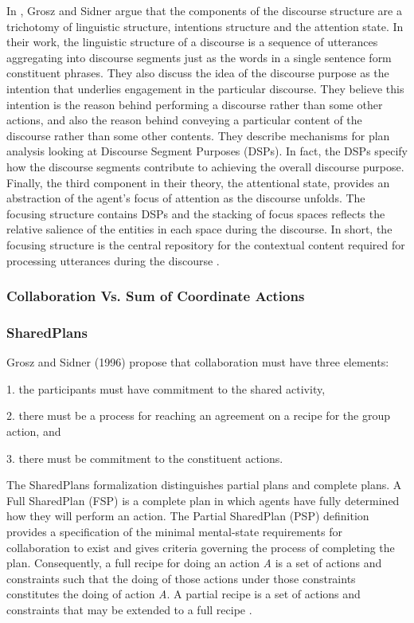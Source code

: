 \documentclass[11pt]{article}
\begin{document}
In \cite{grosz:plans-discourse}, Grosz and Sidner argue that the components of
the discourse structure are a trichotomy of linguistic structure, intentions
structure and the attention state. In their work, the linguistic structure of a
discourse is a sequence of utterances aggregating into discourse segments just
as the words in a single sentence form constituent phrases. They also discuss
the idea of the discourse purpose as the intention that underlies engagement in
the particular discourse. They believe this intention is the reason behind
performing a discourse rather than some other actions, and also the reason
behind conveying a particular content of the discourse rather than some other
contents. They describe mechanisms for plan analysis looking at Discourse
Segment Purposes (DSPs). In fact, the DSPs specify how the discourse segments
contribute to achieving the overall discourse purpose. Finally, the third
component in their theory, the attentional state, provides an abstraction of the
agent's focus of attention as the discourse unfolds. The focusing structure
contains DSPs and the stacking of focus spaces reflects the relative salience of
the entities in each space during the discourse. In short, the focusing
structure is the central repository for the contextual content required for
processing utterances during the discourse \cite{grosz:plans-discourse}.

\subsubsection{Collaboration Vs. Sum of Coordinate Actions}

\cite{grosz:collaborative-systems}

\subsubsection{SharedPlans}

Grosz and Sidner (1996) propose that collaboration must have three elements:

1. the participants must have commitment to the shared activity,

2. there must be a process for reaching an agreement on a recipe for the group
action, and

3. there must be commitment to the constituent actions.

The SharedPlans formalization distinguishes partial plans and complete plans. A
Full SharedPlan (FSP) is a complete plan in which agents have fully determined
how they will perform an action. The Partial SharedPlan (PSP) definition
provides a specification of the minimal mental-state requirements for
collaboration to exist and gives criteria governing the process of completing
the plan. Consequently, a full recipe for doing an action \textit{A} is a set of
actions and constraints such that the doing of those actions under those
constraints constitutes the doing of action \textit{A}. A partial recipe is a
set of actions and constraints that may be extended to a full recipe
\cite{grosz:planning-acting}.
\end{document}
